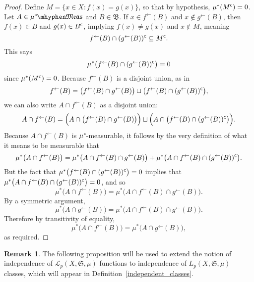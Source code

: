 \documentclass[
twoside=true,
paper=letter,
fontsize=11pt,
pagesize=auto,
leqno,
openany,
headsepline,
overfullrule,
]{scrbook}
\theoremstyle{plain}
\theoremstyle{plain}
\theoremstyle{definition}
\newtheorem{rmk}[thm]{Remark}
\theoremstyle{bfnoteitalic}
\theoremstyle{bfnoteroman}
\newcommand{\sigalg}[1]{\mathfrak{#1}}
\newcommand{\cali}[1]{\mathscr{#1}}
\newcommand{\comp}{^{\hbox{\tiny{$\mathsf C$}}}}
\newcommand{\preimage}[1]{#1^{\leftarrow}}
\newcommand{\meets}{\cap}
\newcommand{\semiring}{\sigalg{S}}
\newcommand{\sigmaalgebraii}{\sigalg{B}}
\newcommand{\measurable}[1]{{#1}\mhyphen\mathfrak{Meas}}
\newcommand{\kernast}{\ast\kern-1pt}
\newcommand{\measurespace}{X}
\newcommand{\mspaceelt}{x}
\newcommand{\measure}{\mu}
\begin{document}
\begin{proof}
Define $M=\{\mspaceelt\in\measurespace : f(\mspaceelt) = g(\mspaceelt)\}$, so that  by hypothesis,
$\measure^*(M\comp) = 0$. Let $A\in \measurable{\measure^\kernast}$ and $B\in\sigmaalgebraii$.
If $\mspaceelt\in\preimage{f}(B)$ and $\mspaceelt\notin\preimage{g}(B)$, then 
$f(\mspaceelt)\in B$ and $g(\mspaceelt)\in B\comp$, implying 
$f(\mspaceelt)\neq g(\mspaceelt)$ and $\mspaceelt\notin M$, meaning 
\[
\preimage{f}(B)\meets (\preimage{g}(B))\comp 
\subseteq 
M\comp.
\]
This says 
\[
\measure^*\bigl(\preimage{f}(B)\meets (\preimage{g}(B))\comp\bigr) = 0
\]
since $\measure^*(M\comp)=0$. 
Because $\preimage{f}(B)$ is a disjoint union, as in
\[
\preimage{f}(B)
=
\bigl(\preimage{f}(B) \meets \preimage{g}(B)\bigr) 
\sqcup
\bigl(\preimage{f}(B) \meets (\preimage{g}(B))\comp\bigr),
\]
we can also write $A\meets\preimage{f}(B)$ as a disjoint union:
\[
A\meets \preimage{f}(B)
=
\Bigl(A\meets\bigl(\preimage{f}(B) \meets \preimage{g}(B)\bigr) \Bigr)
\sqcup
\Bigl(A\meets\bigl(\preimage{f}(B) \meets (\preimage{g}(B))\comp\bigr)\Bigr).
\]
Because $A\meets\preimage{f}(B)$ is $\measure^\kernast$-measurable, it follows by the very definition of what it means to be measurable that
\[
\measure^*\bigl(A\meets \preimage{f}(B)\bigr)
=
\measure^*\bigl(A\meets\preimage{f}(B) \meets \preimage{g}(B)\bigr)
+
\measure^*\bigl(A\meets\preimage{f}(B) \meets (\preimage{g}(B))\comp\bigr).
\]
But the fact that $\measure^*\bigl(\preimage{f}(B)\meets (\preimage{g}(B))\comp\bigr) = 0$
implies that 
$\measure^*\bigl(A\meets\preimage{f}(B)\meets (\preimage{g}(B))\comp\bigr) = 0$,
and so 
\[
\measure^*\bigl(A\meets\preimage{f}(B)\bigr)
=
\measure^*\bigl(A\meets\preimage{f}(B) \meets \preimage{g}(B)\bigr).
\]
By a symmetric argument, 
\[
\measure^*\bigl(A\meets\preimage{g}(B)\bigr)
=
\measure^*\bigl(A\meets\preimage{f}(B) \meets \preimage{g}(B)\bigr).
\]
Therefore by transitivity of equality,
\[
\measure^*\bigl(A\meets\preimage{f}(B)\bigr)
=
\measure^*\bigl(A\meets\preimage{g}(B)\bigr),
\]
as required.
\end{proof}


\begin{rmk}
The following proposition will be used to extend the notion of independence of 
$\cali{L}_p(\measurespace, \semiring, \measure)$
functions to independence of 
$L_p(\measurespace, \semiring, \measure)$
classes, which will appear in Definition~\ref{independent_classes}.
\end{rmk}
\end{document}
